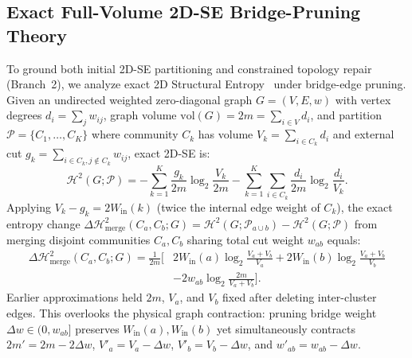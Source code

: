 \subsection{Exact Full-Volume 2D-SE Bridge-Pruning Theory}
\label{sec:theory}
To ground both initial 2D-SE partitioning and constrained topology repair (Branch~2), we analyze exact 2D Structural Entropy~\citep{li2016structural} under bridge-edge pruning. Given an undirected weighted zero-diagonal graph $G=(V, E, w)$ with vertex degrees $d_i = \sum_j w_{ij}$, graph volume $\text{vol}(G) = 2m = \sum_{i \in V} d_i$, and partition $\mathcal{P}=\{C_1,\dots,C_K\}$ where community $C_k$ has volume $V_k = \sum_{i \in C_k} d_i$ and external cut $g_k = \sum_{i \in C_k, j \notin C_k} w_{ij}$, exact 2D-SE is:
\begin{equation}
\label{eq:h2_def}
\mathcal{H}^2(G;\mathcal{P}) = -\sum_{k=1}^{K}\frac{g_k}{2m}\log_2\frac{V_k}{2m} - \sum_{k=1}^{K}\sum_{i \in C_k}\frac{d_i}{2m}\log_2\frac{d_i}{V_k}.
\end{equation}
Applying $V_k - g_k = 2W_{\text{in}}(k)$ (twice the internal edge weight of $C_k$), the exact entropy change $\Delta\mathcal{H}^2_{\text{merge}}(C_a, C_b; G) = \mathcal{H}^2(G; \mathcal{P}_{a \cup b}) - \mathcal{H}^2(G; \mathcal{P})$ from merging disjoint communities $C_a, C_b$ sharing total cut weight $w_{ab}$ equals:
\begin{equation}
\label{eq:merge_delta}
\begin{aligned}
\Delta\mathcal{H}^2_{\text{merge}}(C_a, C_b; G) = \frac{1}{2m}\Big[ &2W_{\text{in}}(a)\log_2\frac{V_a+V_b}{V_a} + 2W_{\text{in}}(b)\log_2\frac{V_a+V_b}{V_b} \\
&- 2w_{ab}\log_2\frac{2m}{V_a+V_b}\Big].
\end{aligned}
\end{equation}
Earlier approximations held $2m$, $V_a$, and $V_b$ fixed after deleting inter-cluster edges. This overlooks the physical graph contraction: pruning bridge weight $\Delta w \in (0, w_{ab}]$ preserves $W_{\text{in}}(a), W_{\text{in}}(b)$ yet simultaneously contracts $2m' = 2m - 2\Delta w$, $V'_a = V_a - \Delta w$, $V'_b = V_b - \Delta w$, and $w'_{ab} = w_{ab} - \Delta w$.


